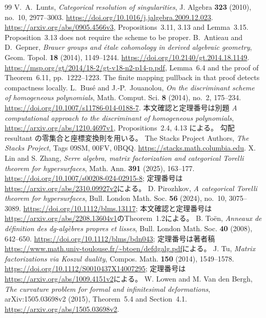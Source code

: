\begin{thebibliography}{99}
V.~A.~Lunts,
\emph{Categorical resolution of singularities},
J. Algebra \textbf{323} (2010), no.~10, 2977--3003.
\url{https://doi.org/10.1016/j.jalgebra.2009.12.023}.
\url{https://arxiv.org/abs/0905.4566v3},
Propositions~3.11, 3.13 and Lemma~3.15.
Proposition~3.13 does not require the scheme to be proper.
B.~Antieau and D.~Gepner,
\emph{Brauer groups and \'etale cohomology in derived algebraic geometry},
Geom. Topol. \textbf{18} (2014), 1149--1244.
\url{https://doi.org/10.2140/gt.2014.18.1149}.
\url{https://msp.org/gt/2014/18-2/gt-v18-n2-p14-p.pdf},
Lemma~6.4 and the proof of Theorem~6.11, pp.~1222--1223.
The finite mapping pullback in that proof detects compactness locally.
L.~Bus\'e and J.-P.~Jouanolou,
\emph{On the discriminant scheme of homogeneous polynomials},
Math. Comput. Sci. \textbf{8} (2014), no.~2, 175--234.
\url{https://doi.org/10.1007/s11786-014-0188-7}.
本文確認と定理番号は別題
\emph{A computational approach to the discriminant of homogeneous polynomials},
\url{https://arxiv.org/abs/1210.4697v1},
Propositions~2.4, 4.13 による。
勾配 resultant の零集合と座標変換則を用いる。
 The Stacks Project Authors,
\emph{The Stacks Project}, Tags 09SM, 00FV, 0BQQ.
\url{https://stacks.math.columbia.edu}.
 X. Lin and S. Zhang,
\emph{Serre algebra, matrix factorization and categorical Torelli theorem for hypersurfaces},
Math. Ann. \textbf{391} (2025), 163--177.
\url{https://doi.org/10.1007/s00208-024-02915-8};
定理番号は\url{https://arxiv.org/abs/2310.09927v2}による。
 D. Pirozhkov,
\emph{A categorical Torelli theorem for hypersurfaces},
Bull. London Math. Soc. \textbf{56} (2024), no.~10, 3075--3089.
\url{https://doi.org/10.1112/blms.13117};
本文確認と定理番号は\url{https://arxiv.org/abs/2208.13604v1}のTheorem~1.2による。
 B. To\"en,
\emph{Anneaux de d\'efinition des dg-alg\`ebres propres et lisses},
Bull. London Math. Soc. \textbf{40} (2008), 642--650.
\url{https://doi.org/10.1112/blms/bdn043};
定理番号は著者稿
\url{https://www.math.univ-toulouse.fr/~btoen/defdgalg.pdf}による。
 J. Tu,
\emph{Matrix factorizations via Koszul duality},
Compos. Math. \textbf{150} (2014), 1549--1578.
\url{https://doi.org/10.1112/S0010437X14007295};
定理番号は\url{https://arxiv.org/abs/1009.4151v2}による。
 W. Lowen and M. Van den Bergh,
\emph{The curvature problem for formal and infinitesimal deformations},
arXiv:1505.03698v2 (2015), Theorem~5.4 and Section~4.1.
\url{https://arxiv.org/abs/1505.03698v2}.

\end{thebibliography}
